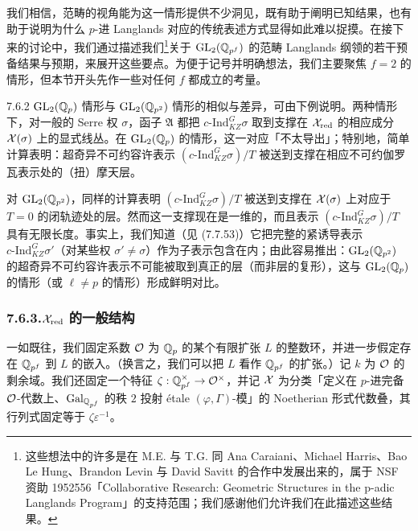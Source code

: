 我们相信，范畴的视角能为这一情形提供不少洞见，既有助于阐明已知结果，也有助于说明为什么 $p$-进 Langlands 对应的传统表述方式显得如此难以捉摸。在接下来的讨论中，我们通过描述我们\footnote{这些想法中的许多是在 M.E. 与 T.G. 同 Ana Caraiani、Michael Harris、Bao Le Hung、Brandon Levin 与 David Savitt 的合作中发展出来的，属于 NSF 资助 1952556「Collaborative Research: Geometric Structures in the p-adic Langlands Program」的支持范围；我们感谢他们允许我们在此描述这些结果。}关于 $\mathrm{GL}_2(\mathbb{Q}_{p^f})$ 的范畴 Langlands 纲领的若干预备结果与预期，来展开这些要点。为便于记号并明确想法，我们主要聚焦 $f=2$ 的情形，但本节开头先作一些对任何 $f$ 都成立的考量。

\begin{rem}{7.6.2}\label{thm:a4-7-6-2}
$\mathrm{GL}_2(\mathbb{Q}_p)$ 情形与 $\mathrm{GL}_2(\mathbb{Q}_{p^2})$ 情形的相似与差异，可由下例说明。两种情形下，对一般的 Serre 权 $\sigma$，函子 $\mathfrak A$ 都把 $c\text{-}\mathrm{Ind}_{KZ}^G\sigma$ 取到支撑在 $\mathcal{X}_{\mathrm{red}}$ 的相应成分 $\mathcal{X}(\sigma)$ 上的显式线丛。在 $\mathrm{GL}_2(\mathbb{Q}_p)$ 的情形，这一对应「不太导出」；特别地，简单计算表明：超奇异不可约容许表示 $(c\text{-}\mathrm{Ind}_{KZ}^G\sigma)/T$ 被送到支撑在相应不可约伽罗瓦表示处的（扭）摩天层。

对 $\mathrm{GL}_2(\mathbb{Q}_{p^2})$，同样的计算表明 $(c\text{-}\mathrm{Ind}_{KZ}^G\sigma)/T$ 被送到支撑在 $\mathcal{X}(\sigma)$ 上对应于 $T=0$ 的闭轨迹处的层。然而这一支撑现在是一维的，而且表示 $(c\text{-}\mathrm{Ind}_{KZ}^G\sigma)/T$ 具有无限长度。事实上，我们知道（见 (7.7.53)）它把完整的紧诱导表示 $c\text{-}\mathrm{Ind}_{KZ}^G\sigma'$（对某些权 $\sigma'\ne\sigma$）作为子表示包含在内；由此容易推出：$\mathrm{GL}_2(\mathbb{Q}_{p^2})$ 的超奇异不可约容许表示不可能被取到真正的层（而非层的复形），这与 $\mathrm{GL}_2(\mathbb{Q}_p)$ 的情形（或 $\ell\ne p$ 的情形）形成鲜明对比。
\end{rem}

\subsubsection*{7.6.3.\quad $\mathcal{X}_{\mathrm{red}}$ 的一般结构}
一如既往，我们固定系数 $\mathcal{O}$ 为 $\mathbb{Q}_p$ 的某个有限扩张 $L$ 的整数环，并进一步假定存在 $\mathbb{Q}_{p^f}$ 到 $L$ 的嵌入。（换言之，我们可以把 $L$ 看作 $\mathbb{Q}_{p^f}$ 的扩张。）记 $k$ 为 $\mathcal{O}$ 的剩余域。我们还固定一个特征 $\zeta:\mathbb{Q}_{p^f}^\times\to\mathcal{O}^\times$，并记 $\mathcal{X}$ 为分类「定义在 $p$-进完备 $\mathcal{O}$-代数上、$\operatorname{Gal}_{\mathbb{Q}_{p^f}}$ 的秩 $2$ 投射 étale $(\varphi,\Gamma)$-模」的 Noetherian 形式代数叠，其行列式固定等于 $\zeta\varepsilon^{-1}$。

